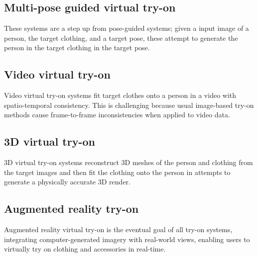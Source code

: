 	\subsection{Multi-pose guided virtual try-on}
		These systems are a step up from pose-guided systems; given a input image of a person, the target clothing, and a target pose, these attempt to generate the person in the target clothing in the target pose.

	\subsection{Video virtual try-on}
		Video virtual try-on systems fit target clothes onto a person in a video with spatio-temporal consistency. This is challenging because usual image-based try-on methods cause frame-to-frame inconsistencies when applied to video data.

	\subsection{3D virtual try-on}
		3D virtual try-on systems reconstruct 3D meshes of the person and clothing from the target images and then fit the clothing onto the person in attempts to generate a physically accurate 3D render.

	\subsection{Augmented reality try-on}
		Augmented reality virtual try-on is the eventual goal of all try-on systems, integrating computer-generated imagery with real-world views, enabling users to virtually try on clothing and accessories in real-time.
		




